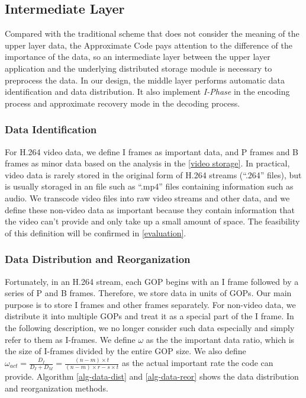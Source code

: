 \documentclass[sigconf]{acmart}
\begin{document}
\subsection{Intermediate Layer}\label{Intermediate Layer}
Compared with the traditional scheme that does not consider the meaning of the upper layer data, the Approximate Code pays attention to the difference of the importance of the data, so an intermediate layer between the upper layer application and the underlying distributed storage module is necessary to preprocess the data. In our design, the middle layer performs automatic data identification and data distribution. It also implement \emph{I-Phase} in the encoding process and approximate recovery mode in the decoding process.

\subsubsection{Data Identification}
For H.264 video data, we define I frames as important data, and P frames and B frames as minor data based on the analysis in the \ref{video storage}. In practical, video data is rarely stored in the original form of H.264 streams (``.264'' files), but is usually storaged in an file such as ``.mp4'' files containing information such as audio. We transcode video files into raw video streams and other data, and we define these non-video data as important because they contain information that the video can't provide and only take up a small amount of space. The feasibility of this definition will be confirmed in \ref{evaluation}.

\subsubsection{Data Distribution and Reorganization}
Fortunately, in an H.264 stream, each GOP begins with an I frame followed by a series of P and B frames. Therefore, we store data in units of GOPs. Our main purpose is to store I frames and other frames separately. For non-video data, we distribute it into multiple GOPs and treat it as a special part of the I frame. In the following description, we no longer consider such data especially and simply refer to them as I-frames.
We define $\omega$ as the the important data ratio, which is the size of I-frames divided by the entire GOP size. We also define $\omega_{act}=\frac{D_I}{D_I+D_M}=\frac{(n-m) \times t}{(n-m) \times r-s \times t}$ as the actual important rate the code can provide. Algorithm \ref{alg-data-dist} and \ref{alg-data-reor} shows the data distribution and reorganization methods.
\end{document}
